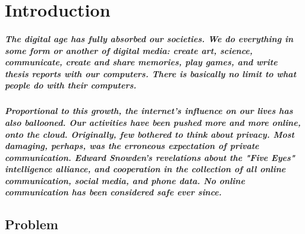 




\chapter{Introduction}

\paragraph{The digital age has fully absorbed our societies. We do everything in some form or another of digital media: create art, science, communicate, create and share memories, play games, and write thesis reports with our computers. There is basically no limit to what people do with their computers.}

\paragraph{Proportional to this growth, the internet's influence on our lives has also ballooned. Our activities have been pushed more and more online, onto the cloud. Originally, few bothered to think about privacy. Most damaging, perhaps, was the erroneous expectation of private communication. Edward Snowden's revelations about the "Five Eyes" intelligence alliance, and cooperation in the collection of all online communication, social media, and phone data. No online communication has been considered safe ever since.}


\section{Problem}

